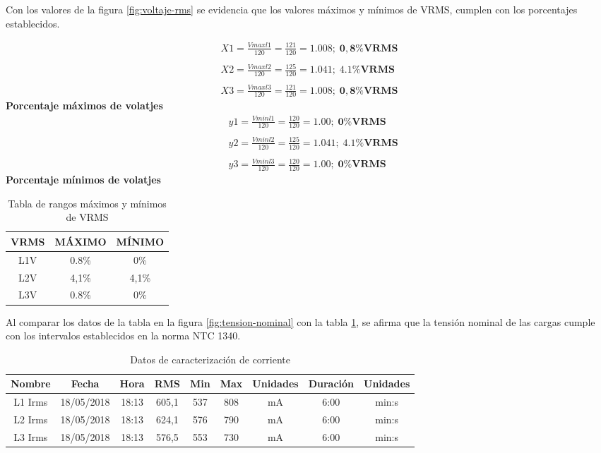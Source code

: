 Con los valores de la figura \ref{fig:voltaje-rms} se evidencia que los valores máximos y mínimos de VRMS, cumplen con los porcentajes establecidos.

\begin{align*}
X1 = \frac{Vmaxl1}{120} = \frac{121}{120} = 1.008;\;\mathbf{ 0,8\% VRMS} \\\\
X2 = \frac{Vmaxl2}{120} = \frac{125}{120} = 1.041;\;\mathbf{ 4.1\% VRMS} \\\\
X3 = \frac{Vmaxl3}{120} = \frac{121}{120} = 1.008;\;\mathbf{ 0,8\% VRMS}
\end{align*}
\textbf{Porcentaje máximos de volatjes}\\
\begin{align*}
&y1 = \frac{Vminl1}{120} = \frac{120}{120} = 1.00;\;\mathbf{ 0\% VRMS} \\\\
&y2 = \frac{Vminl2}{120} = \frac{125}{120} = 1.041;\;\mathbf{ 4.1\% VRMS} \\\\
&y3 = \frac{Vminl3}{120} = \frac{120}{120} = 1.00;\;\mathbf{ 0\% VRMS}
\end{align*}
\textbf{Porcentaje mínimos de volatjes}\\

\begin{table}
\begin{center}
\begin{tabular}{ |c|c|c| } 
\hline
VRMS & MÁXIMO & MÍNIMO\\
\hline
L1V & 0.8\% & 0\%\\
\hline
L2V & 4,1\% & 4,1\%\\
\hline
L3V & 0.8\% & 0\%\\
\hline
\end{tabular}
\end{center}
\caption{Tabla de rangos máximos y mínimos de VRMS}
\label{tab:rangos-vrms}
\end{table}

Al comparar los datos de la tabla en la figura \ref{fig:tension-nominal} con la tabla \ref{tab:rangos-vrms}, se afirma que la tensión nominal de las cargas cumple con los intervalos establecidos en la norma NTC 1340.\\

\begin{table}[!htbp]
\begin{center}
\begin{tabular}{ |c|c|c|c|c|c|c|c|c| } 
\hline
Nombre & Fecha & Hora & RMS & Min & Max & Unidades & Duración & Unidades\\
\hline
L1 Irms & 18/05/2018 & 18:13 & 605,1 & 537 & 808 & mA & 6:00 & min:s\\
\hline
L2 Irms & 18/05/2018 & 18:13 & 624,1 & 576 & 790 & mA & 6:00 & min:s\\
\hline
L3 Irms & 18/05/2018 & 18:13 & 576,5 & 553 & 730 & mA & 6:00 & min:s\\
\hline
\end{tabular}
\end{center}
\caption{Datos de caracterización de corriente}
\label{tab:ejercicio-corriente}
\end{table}


